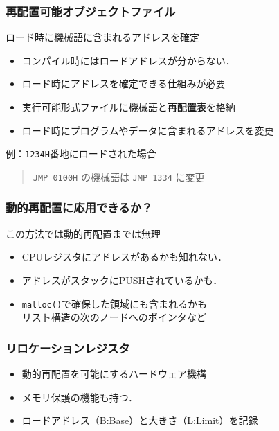 \documentclass{beamer}                   %
\begin{document}
\begin{frame}
  \frametitle{再配置可能オブジェクトファイル}
  ロード時に機械語に含まれるアドレスを確定
  \begin{itemize}
    \item コンパイル時にはロードアドレスが分からない．
    \item ロード時にアドレスを確定できる仕組みが必要
    \item 実行可能形式ファイルに機械語と{\bf 再配置表}を格納
    \item ロード時にプログラムやデータに含まれるアドレスを変更
  \end{itemize}
  \vfill
    例：{\tt 1234H}番地にロードされた場合\\
    \begin{quote}
    {\tt JMP 0100H} の機械語は {\tt JMP 1334} に変更
    \end{quote}
\end{frame}

\begin{frame}
  \frametitle{動的再配置に応用できるか？}
    この方法では動的再配置までは無理
  \begin{itemize}
    \item CPUレジスタにアドレスがあるかも知れない．
    \item アドレスがスタックにPUSHされているかも．
    \item {\tt malloc()}で確保した領域にも含まれるかも\\
      リスト構造の次のノードへのポインタなど
  \end{itemize}
\end{frame}

\begin{frame}
  \frametitle{リロケーションレジスタ}
  \begin{itemize}
    \item 動的再配置を可能にするハードウェア機構
    \item メモリ保護の機能も持つ．
    \item ロードアドレス（B:Base）と大きさ（L:Limit）を記録
  \end{itemize}
\end{frame}
\end{document}
